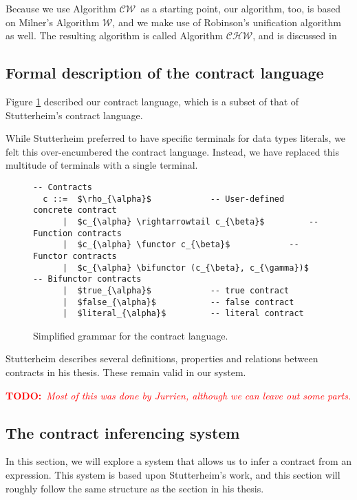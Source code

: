 \documentclass[10pt]{report}
\makeatletter
\newcommand{\functor}{<\!\!\!@\!\!\!>}
\newcommand{\bifunctor}{<\!\!\!@\!\!@\!\!\!>}
\newcommand{\W}{$\mathcal{W}$}
\newcommand{\CW}{$\mathcal{CW}$}
\newcommand{\CHW}{$\mathcal{CHW}$}
\newcommand{\annotate}[3]{
	\begin{scriptsize}
	\textcolor{#1}{\textbf{#2}~\textit{#3}}
	\end{scriptsize}\newline}
\newcommand{\todo}[1]{\annotate{red} {TODO:} {#1}}
\newcommand{\code}[1]{%
  {%
   \setlength{\fboxsep}{-2\fboxrule}%
   \fcolorbox{black}{light-gray}{\hspace{1.5pt}\strut\texttt{#1}\hspace{1.5pt}}%
  }%
}
\makeatother
\begin{document}
Because we use Algorithm \CW ~as a starting point, our algorithm, too, is based on Milner's Algorithm \W, and we make use of Robinson's unification algorithm as well.
The resulting algorithm is called Algorithm \CHW, and is discussed in

\subsection{Formal description of the contract language}
Figure \ref{fig:contract-grammar} described our contract language, which is a subset of that of Stutterheim's contract language.

While Stutterheim preferred to have specific terminals for data types literals, we felt this over-encumbered the contract language.
Instead, we have replaced this multitude of terminals with a single \code{literal} terminal.

\begin{figure}[htbp]
\begin{center}
\begin{lstlisting}[mathescape]
  -- Contracts
  c ::=  $\rho_{\alpha}$			-- User-defined concrete contract
      |  $c_{\alpha} \rightarrowtail c_{\beta}$			-- Function contracts
      |  $c_{\alpha} \functor c_{\beta}$			-- Functor contracts
      |  $c_{\alpha} \bifunctor (c_{\beta}, c_{\gamma})$			-- Bifunctor contracts
      |  $true_{\alpha}$			-- true contract
      |  $false_{\alpha}$			-- false contract
      |  $literal_{\alpha}$			-- literal contract
\end{lstlisting}
\end{center}
\caption{\label{fig:contract-grammar}Simplified grammar for the contract language.}
\end{figure}

Stutterheim describes several definitions, properties and relations between contracts in his thesis.
These remain valid in our system.

\todo{Most of this was done by Jurrien, although we can leave out some parts.}



\subsection{The contract inferencing system}
In this section, we will explore a system that allows us to infer a contract from an expression.
This system is based upon Stutterheim's work, and this section will roughly follow the same structure as the section in his thesis.
\end{document}
